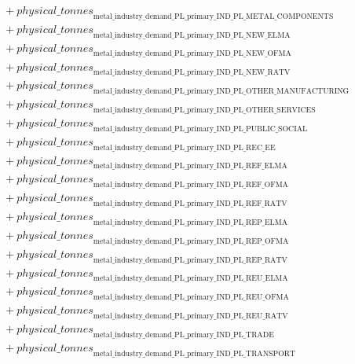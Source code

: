 \documentclass[11pt]{article}
\begin{document}
\begin{align*}
&\quad {}+ {physical\_tonnes}_{\text{metal\_industry\_demand\_PL\_primary\_IND\_PL\_METAL\_COMPONENTS}}\\
&\quad {}+ {physical\_tonnes}_{\text{metal\_industry\_demand\_PL\_primary\_IND\_PL\_NEW\_ELMA}}\\
&\quad {}+ {physical\_tonnes}_{\text{metal\_industry\_demand\_PL\_primary\_IND\_PL\_NEW\_OFMA}}\\
&\quad {}+ {physical\_tonnes}_{\text{metal\_industry\_demand\_PL\_primary\_IND\_PL\_NEW\_RATV}}\\
&\quad {}+ {physical\_tonnes}_{\text{metal\_industry\_demand\_PL\_primary\_IND\_PL\_OTHER\_MANUFACTURING}}\\
&\quad {}+ {physical\_tonnes}_{\text{metal\_industry\_demand\_PL\_primary\_IND\_PL\_OTHER\_SERVICES}}\\
&\quad {}+ {physical\_tonnes}_{\text{metal\_industry\_demand\_PL\_primary\_IND\_PL\_PUBLIC\_SOCIAL}}\\
&\quad {}+ {physical\_tonnes}_{\text{metal\_industry\_demand\_PL\_primary\_IND\_PL\_REC\_EE}}\\
&\quad {}+ {physical\_tonnes}_{\text{metal\_industry\_demand\_PL\_primary\_IND\_PL\_REF\_ELMA}}\\
&\quad {}+ {physical\_tonnes}_{\text{metal\_industry\_demand\_PL\_primary\_IND\_PL\_REF\_OFMA}}\\
&\quad {}+ {physical\_tonnes}_{\text{metal\_industry\_demand\_PL\_primary\_IND\_PL\_REF\_RATV}}\\
&\quad {}+ {physical\_tonnes}_{\text{metal\_industry\_demand\_PL\_primary\_IND\_PL\_REP\_ELMA}}\\
&\quad {}+ {physical\_tonnes}_{\text{metal\_industry\_demand\_PL\_primary\_IND\_PL\_REP\_OFMA}}\\
&\quad {}+ {physical\_tonnes}_{\text{metal\_industry\_demand\_PL\_primary\_IND\_PL\_REP\_RATV}}\\
&\quad {}+ {physical\_tonnes}_{\text{metal\_industry\_demand\_PL\_primary\_IND\_PL\_REU\_ELMA}}\\
&\quad {}+ {physical\_tonnes}_{\text{metal\_industry\_demand\_PL\_primary\_IND\_PL\_REU\_OFMA}}\\
&\quad {}+ {physical\_tonnes}_{\text{metal\_industry\_demand\_PL\_primary\_IND\_PL\_REU\_RATV}}\\
&\quad {}+ {physical\_tonnes}_{\text{metal\_industry\_demand\_PL\_primary\_IND\_PL\_TRADE}}\\
&\quad {}+ {physical\_tonnes}_{\text{metal\_industry\_demand\_PL\_primary\_IND\_PL\_TRANSPORT}}\\

\end{align*}
\end{document}
